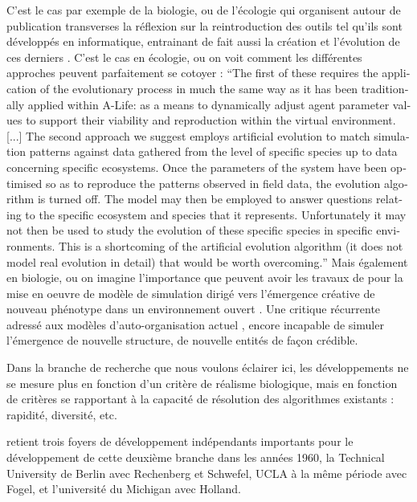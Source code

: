 C'est le cas par exemple de la biologie, ou de l'écologie \autocite{Hamblin2013} qui organisent autour de publication transverses la réflexion sur la reintroduction des outils tel qu'ils sont développés en informatique, entrainant de fait aussi la création et l'évolution de ces derniers \autocite{Hogeweg2011}. C'est le cas en écologie, ou on voit comment les différentes approches peuvent parfaitement se cotoyer  : \foreignquote{english}{The first of these requires the application of the evolutionary process in much the same way as it has been traditionally applied within A-Life: as a means to dynamically adjust agent parameter values to support their viability and reproduction within the virtual environment. [...] The second approach we suggest employs artificial evolution to match simulation patterns against data gathered from the level of specific species up to data concerning specific ecosystems. Once the parameters of the system have been optimised so as to reproduce the patterns observed in field data, the evolution algorithm is turned off. The model may then be employed to answer questions relating to the specific ecosystem and species that it represents. Unfortunately it may not then be used to study the evolution of these specific species in specific environments. This is a shortcoming of the artificial evolution algorithm (it does not model real evolution in detail) that would be worth overcoming.} \autocite{Dorin2008} Mais également en biologie, ou on imagine l'importance que peuvent avoir les travaux de \textcites{Taylor2001}[221]{Taylor1999} pour la mise en oeuvre de modèle de simulation dirigé vers l'émergence créative de nouveau phénotype dans un environnement ouvert \autocite[33]{Taylor1999}. Une critique récurrente adressé aux modèles d'auto-organisation actuel \autocite{Pumain2003}, encore incapable de simuler l'émergence de nouvelle structure, de nouvelle entités de façon crédible. 

Dans la branche de recherche que nous voulons éclairer ici, les développements ne se mesure plus en fonction d'un critère de réalisme biologique, mais en fonction de critères se rapportant à la capacité de résolution des algorithmes existants : rapidité, diversité, etc.

\textcite{DeJong2006a} retient trois foyers de développement indépendants importants pour le développement de cette deuxième branche dans les années 1960, la Technical University de Berlin avec Rechenberg et Schwefel, UCLA à la même période avec Fogel, et l'université du Michigan avec Holland.

